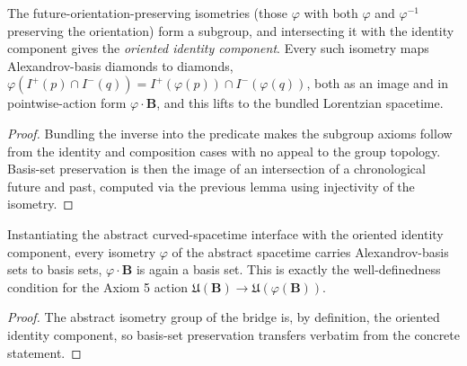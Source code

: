 \medskip

\begin{lemma}
    \label{lmm:isometry-preserves-basis-sets}
    \leanok
    The future-orientation-preserving isometries (those $\varphi$ with both $\varphi$ and $\varphi^{-1}$ preserving the orientation) form a subgroup, and intersecting it with the identity component gives the \emph{oriented identity component}. Every such isometry maps Alexandrov-basis diamonds to diamonds, $\varphi(I^+(p) \cap I^-(q)) = I^+(\varphi(p)) \cap I^-(\varphi(q))$, both as an image and in pointwise-action form $\varphi \cdot \mathbf{B}$, and this lifts to the bundled Lorentzian spacetime.
\end{lemma}
\begin{proof}
    \leanok
    Bundling the inverse into the predicate makes the subgroup axioms follow from the identity and composition cases with no appeal to the group topology. Basis-set preservation is then the image of an intersection of a chronological future and past, computed via the previous lemma using injectivity of the isometry.
\end{proof}

\medskip

\begin{lemma}
    \label{lmm:axiom5-basis-preservation}
    \leanok
    Instantiating the abstract curved-spacetime interface with the oriented identity component, every isometry $\varphi$ of the abstract spacetime carries Alexandrov-basis sets to basis sets, $\varphi \cdot \mathbf{B}$ is again a basis set. This is exactly the well-definedness condition for the Axiom 5 action $\mathfrak{U}(\mathbf{B}) \to \mathfrak{U}(\varphi(\mathbf{B}))$.
\end{lemma}
\begin{proof}
    \leanok
    The abstract isometry group of the bridge is, by definition, the oriented identity component, so basis-set preservation transfers verbatim from the concrete statement.
\end{proof}

